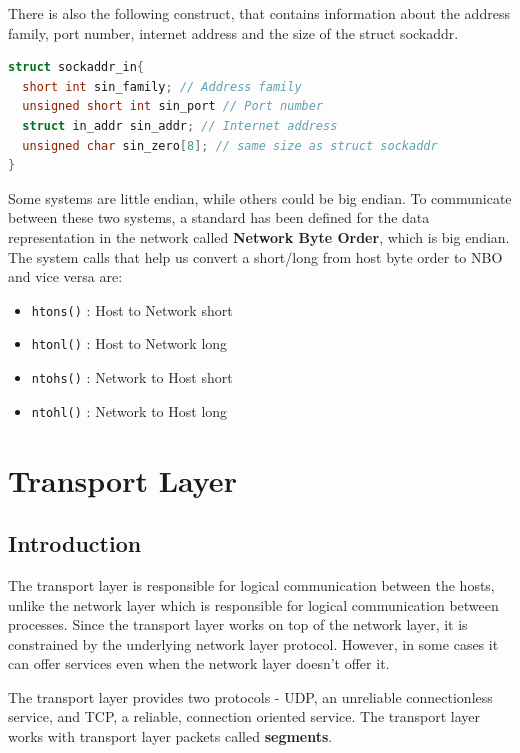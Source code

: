 \documentclass[12pt,letterpaper]{amsbook}
\theoremstyle{definition}
\begin{document}
There is also the following construct, that contains information about the address family, port number, internet address and the size of the struct sockaddr.

\begin{lstlisting}[language=c]
struct sockaddr_in{
  short int sin_family; // Address family
  unsigned short int sin_port // Port number
  struct in_addr sin_addr; // Internet address
  unsigned char sin_zero[8]; // same size as struct sockaddr
}
\end{lstlisting}

Some systems are little endian, while others could be big endian. To communicate between these two systems, a standard has been defined for the data representation in the network called \textbf{Network Byte Order}, which is big endian. The system calls that help us convert a short/long from host byte order to NBO and vice versa are:

\begin{itemize}
  \item \texttt{htons()} : Host to Network short
  \item \texttt{htonl()} : Host to Network long
  \item \texttt{ntohs()} : Network to Host short
  \item \texttt{ntohl()} : Network to Host long
\end{itemize}

\chapter{Transport Layer}

\section{Introduction}

The transport layer is responsible for logical communication between the hosts, unlike the network layer which is responsible for logical communication between processes. Since the transport layer works on top of the network layer, it is constrained by the underlying network layer protocol. However, in some cases it can offer services even when the network layer doesn't offer it.

The transport layer provides two protocols - UDP, an unreliable connectionless service, and TCP, a reliable, connection oriented service. The transport layer works with transport layer packets called \textbf{segments}. 
\end{document}
